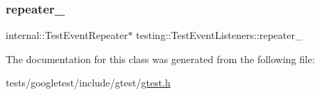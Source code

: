 \mbox{\label{classtesting_1_1TestEventListeners_a625d58b951893e80cde12862aece6fd8}} 
\subsubsection{\texorpdfstring{repeater\+\_\+}{repeater\_}}
{\footnotesize\ttfamily internal\+::\+Test\+Event\+Repeater$\ast$ testing\+::\+Test\+Event\+Listeners\+::repeater\+\_\+\hspace{0.3cm}{\ttfamily [private]}}



The documentation for this class was generated from the following file\+:\begin{DoxyCompactItemize}
\item 
tests/googletest/include/gtest/\hyperlink{gtest_8h}{gtest.\+h}\end{DoxyCompactItemize}
